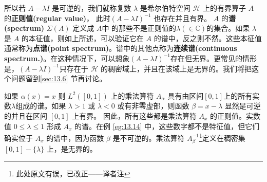 所以若 \(A-\lambda I\) 是可逆的，我们就称复数 \(\lambda\) 是希尔伯特空间 \(\mathcal{H}\) 上的有界算子 \(A\) 的\textbf{正则值(regular value)}， 此时\((A-\lambda I)^{-1}\) 也存在并且有界。 \(A\) 的\textbf{谱(spectrum)} \(\Sigma(A)\) 定义成 \(A\)中 的那些不是正则值的\(\lambda(\in\mathbb{C})\)的集合。如果 \(\lambda\) 是 \(A\) 的本征值，则如上所述，可以验证它在 \(A\) 的谱中，反之则不然。这些本征值通常称为\textbf{点谱(point spectrum)}。谱中的其他点称为\textbf{连续谱(continuous spectrum.)}。在这种情况下，可以想象\((A-\lambda I)^{-1}\)存在但无界。更常见的情形是，\((A-\lambda I)^{-1}\)只存在于 \(\mathcal{H}\) 的稠密域上，并且在该域上是无界的。我们将把这个问题留到\ref{sec:13.6} 节再讨论。
\begin{eg}
    如果 \(\alpha(x)=x\) 则 \(L^{2}([0,1])\) 上的乘法算符 \(A_{\alpha}\) 具有由区间\([0,1]\)上的所有实数\(\lambda\)组成的谱。如果 \(\lambda>1\) 或 \(\lambda<0\) 或有非零虚部，则函数 \(\beta=x-\lambda\) 显然是可逆的并且在区间 \([0,1]\) 上有界。
    因此，所有这些都是乘法算符 \(A_{x}\) 的正则值。实数值 \(0 \leq \lambda \leq 1\) 形成 \(A_{x}\) 的谱。在例 \ref{eg:13.14} 中，这些数字都不是特征值，但它们确实位于 \(A_{x}\) 的谱中，因为函数 \(\beta\) 是不可逆的。乘法算符 \(A^{-1}_{\beta}\)\footnote{此处原文有误，已改正——译者注}定义在稠密集 \([0,1]-\{\lambda\}\) 上，是无界的。
\end{eg}
